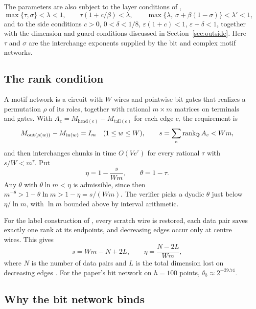 The parameters are also subject to the layer conditions of \cite[\S9.1]{OAI},
\begin{equation}\label{eq:layer}
\max\{\tau,\sigma\} < \lambda < 1,\qquad \tau(1+c/\beta) < \lambda,\qquad \max\{\lambda,\ \sigma+\beta(1-\sigma)\} < \lambda' < 1,
\end{equation}
and to the side conditions $c>0$, $0<\delta<1/8$, $\varepsilon(1+c)<1$, $\varepsilon+\delta<1$, together with the dimension and guard conditions discussed in Section~\ref{sec:outside}. Here $\tau$ and $\sigma$ are the interchange exponents supplied by the bit and complex motif networks.

\subsection{The rank condition}

A motif network is a circuit with $W$ wires and pointwise bit gates that realizes a permutation $\rho$ of its roles, together with rational $m\times m$ matrices on terminals and gates. With $A_e = M_{\mathrm{head}(e)} - M_{\mathrm{tail}(e)}$ for each edge $e$, the requirement \cite[(11)]{OAI} is
\[
M_{\mathrm{out}(\rho(w))} - M_{\mathrm{in}(w)} = I_m \quad (1\le w\le W), \qquad s = \sum_e \operatorname{rank}_{\mathbb{Q}} A_e < Wm,
\]
and \cite[Prop.~11]{OAI} then interchanges chunks in time $O(Ve^\tau)$ for every rational $\tau$ with $s/W < m^\tau$. Put
\[
\eta = 1 - \frac{s}{Wm}, \qquad \theta = 1-\tau .
\]
Any $\theta$ with $\theta\ln m < \eta$ is admissible, since then $m^{-\theta} > 1-\theta\ln m > 1-\eta = s/(Wm)$. The verifier picks a dyadic $\theta$ just below $\eta/\ln m$, with $\ln m$ bounded above by interval arithmetic.

For the label construction of \cite[\S3]{OAI}, every scratch wire is restored, each data pair saves exactly one rank at its endpoints, and decreasing edges occur only at centre wires. This gives
\begin{equation}\label{eq:s}
s = Wm - N + 2L, \qquad \eta = \frac{N-2L}{Wm},
\end{equation}
where $N$ is the number of data pairs and $L$ is the total dimension lost on decreasing edges \cite[Prop.~7]{OAI}. For the paper's bit network on $h=100$ points, $\theta_b \approx 2^{-39.74}$.

\subsection{Why the bit network binds}

